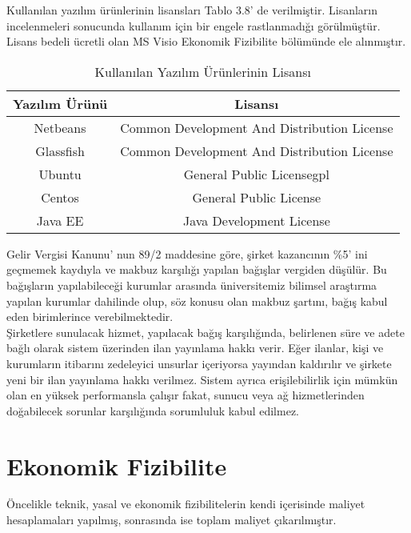 Kullanılan yazılım ürünlerinin lisansları Tablo 3.8’ de verilmiştir. Lisanların
incelenmeleri sonucunda kullanım için bir engele rastlanmadığı görülmüştür. Lisans bedeli ücretli olan MS Visio
Ekonomik Fizibilite bölümünde ele alınmıştır.

\begin{table}[]
\centering
\caption{Kullanılan Yazılım Ürünlerinin Lisansı}
\label{my-label}
\begin{tabular}{|c|c|}
\hline
Yazılım Ürünü & Lisansı                                     \\ \hline
Netbeans\cite{netbeansLisans} & Common Development And Distribution License\cite{cddl} \\ \hline
Glassfish\cite{glassfishLisans}     & Common Development And Distribution License\cite{cddl} \\ \hline
Ubuntu\cite{ubuntuLisans}        & General Public License{gpl}                      \\ \hline
Centos        & General Public License\cite{gpl}                      \\ \hline
Java EE       & Java Development License\cite{jdl}                    \\ \hline
\end{tabular}
\end{table}


Gelir Vergisi Kanunu’ nun 89/2 maddesine göre\cite{vergi}, şirket kazancının \%5’ ini
geçmemek kaydıyla ve makbuz karşılığı yapılan bağışlar vergiden düşülür. Bu
bağışların yapılabileceği kurumlar arasında üniversitemiz bilimsel araştırma yapılan
kurumlar dahilinde olup, söz konusu olan makbuz şartını, bağış kabul eden birimlerince
verebilmektedir. \\
Şirketlere sunulacak hizmet, yapılacak bağış karşılığında, belirlenen süre ve adete bağlı
olarak sistem üzerinden ilan yayınlama hakkı verir. Eğer ilanlar, kişi ve kurumların
itibarını zedeleyici unsurlar içeriyorsa yayından kaldırılır ve şirkete yeni bir ilan
yayınlama hakkı verilmez. Sistem ayrıca erişilebilirlik için mümkün olan en yüksek
performansla çalışır fakat, sunucu veya ağ hizmetlerinden doğabilecek sorunlar
karşılığında sorumluluk kabul edilmez.

\section{Ekonomik Fizibilite}
Öncelikle teknik, yasal ve ekonomik fizibilitelerin kendi içerisinde maliyet hesaplamaları yapılmış, sonrasında ise
toplam maliyet çıkarılmıştır.

